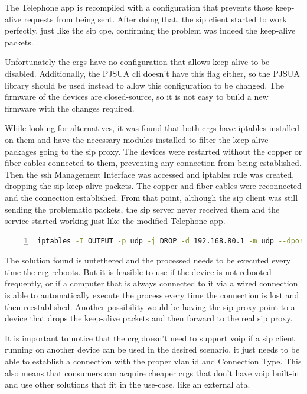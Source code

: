 The Telephone app is recompiled with a configuration that prevents those keep-alive requests from being sent. After doing that, the \gls{sip} client started to work perfectly, just like the \gls{sip} \gls{cpe}, confirming the problem was indeed the keep-alive packets.

Unfortunately the \glspl{crg} have no configuration that allows keep-alive to be disabled. Additionally, the PJSUA \gls{cli} doesn’t have this flag either, so the PJSUA library should be used instead to allow this configuration to be changed. The firmware of the devices are closed-source, so it is not easy to build a new firmware with the changes required.

While looking for alternatives, it was found that both \glspl{crg} have iptables installed on them and have the necessary modules installed to filter the keep-alive packages going to the \gls{sip} proxy. The devices were restarted without the copper or fiber cables connected to them, preventing any connection from being established. Then the \gls{ssh} Management Interface was accessed and iptables rule was created, dropping the \gls{sip} keep-alive packets. The copper and fiber cables were reconnected and the connection established. From that point, although the \gls{sip} client was still sending the problematic packets, the \gls{sip} server never received them and the service started working just like the modified Telephone app.

\begin{lstlisting}[language=Bash,numbers=left]
iptables -I OUTPUT -p udp -j DROP -d 192.168.80.1 -m udp --dport 5060 -m string --hex-string '|0d0a|' --algo bm --from 28 --to 30
\end{lstlisting}

The solution found is untethered and the processed needs to be executed every time the \gls{crg} reboots. But it is feasible to use if the device is not rebooted frequently, or if a computer that is always connected to it via a wired connection is able to automatically execute the process every time the connection is lost and then reestablished. Another possibility would be having the \gls{sip} proxy point to a device that drops the keep-alive packets and then forward to the real \gls{sip} proxy.

It is important to notice that the \gls{crg} doesn’t need to support \gls{voip} if a \gls{sip} client running on another device can be used in the desired scenario, it just needs to be able to establish a connection with the proper \gls{vlan} \gls{id} and Connection Type. This also means that consumers can acquire cheaper \glspl{crg} that don’t have \gls{voip} built-in and use other solutions that fit in the use-case, like an external \gls{ata}.

\FloatBarrier
